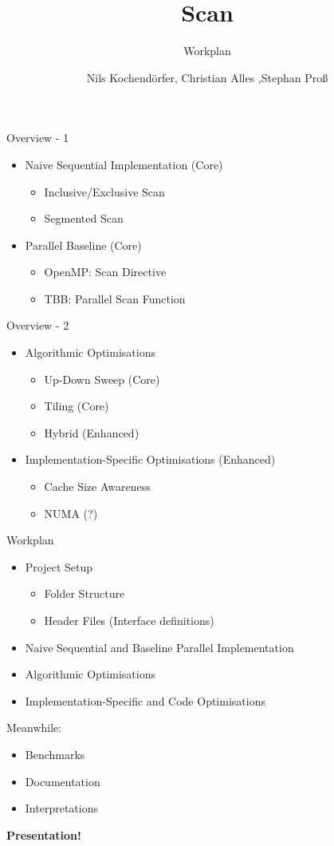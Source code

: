 \documentclass[compress, 11pt]{beamer}
\title[Scan]{Scan}
\subtitle{Workplan}
\author{Nils Kochendörfer, Christian Alles ,Stephan Proß}
\institute{Heidelberg University}
\begin{document}

\frame{\titlepage}

\begin{frame}{Overview - 1}
\begin{itemize}
 \item Naive Sequential Implementation (Core)
 \begin{itemize}
  \item Inclusive/Exclusive Scan
  \item Segmented Scan
 \end{itemize}
 \item Parallel Baseline (Core)
 \begin{itemize}
  \item OpenMP: Scan Directive
  \item TBB: Parallel Scan Function
 \end{itemize}
\end{itemize}
\end{frame}
\begin{frame}{Overview - 2}
\begin{itemize}
 \item Algorithmic Optimisations
 \begin{itemize}
  \item Up-Down Sweep (Core)
  \item Tiling (Core)
  \item Hybrid (Enhanced)
 \end{itemize}
 \item Implementation-Specific Optimisations (Enhanced)
 \begin{itemize}
  \item Cache Size Awareness
  \item NUMA (?)
 \end{itemize}
\end{itemize}

\end{frame}
\begin{frame}{Workplan}
\begin{itemize}
\item Project Setup
\begin{itemize}
 \item Folder Structure
 \item Header Files (Interface definitions)
\end{itemize}
\item Naive Sequential and Baseline Parallel Implementation
\item Algorithmic Optimisations
\item Implementation-Specific and Code Optimisations
\end{itemize}
Meanwhile:
\begin{itemize}
 \item Benchmarks
 \item Documentation
 \item Interpretations
\end{itemize}
\pause
\begin{center}
  \bfseries Presentation!
\end{center}

 
\end{frame}
\end{document}
